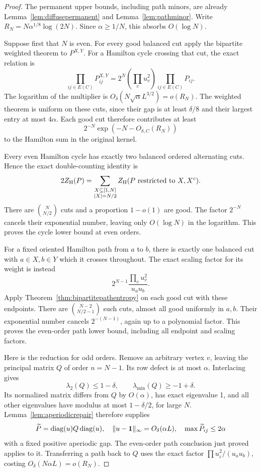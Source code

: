 \begin{proof}
The permanent upper bounds, including path minors, are already
Lemma~\ref{lem:diffusepermanent} and Lemma~\ref{lem:pathminor}.
Write \(R_N=N\alpha^{1/8}\log(2N)\).
Since \(\alpha\geq1/N\), this absorbs \(O(\log N)\).

Suppose first that \(N\) is even.
For every good balanced cut apply the bipartite weighted
theorem to \(P^{X,Y}\).
For a Hamilton cycle crossing that cut, the exact relation is
\[
 \prod_{ij\in E(C)}P^{X,Y}_{ij}
       =2^N\left(\prod_vu_v^2\right)
                         \prod_{ij\in E(C)}P_{ij}.
\]
The logarithm of the multiplier is
\(O_\delta(N\sqrt\alpha L^{3/2})=o(R_N)\).
The weighted theorem is uniform on these cuts, since their
gap is at least \(\delta/8\) and their largest entry at most
\(4\alpha\). Each good cut therefore contributes at least
\[
 2^{-N}\exp(-N-O_{\delta,C}(R_N))
\]
to the Hamilton sum in the original kernel.

Every even Hamilton cycle has exactly two balanced ordered
alternating cuts. Hence the exact double-counting identity is
\[
 2Z_{\rm H}(P)
       =\sum_{\substack{X\subseteq[1,N]\\|X|=N/2}}
                        Z_{\rm H}(P\hbox{ restricted to }X,X^c).
\]
There are \(\binom N{N/2}\) cuts and a proportion \(1-o(1)\)
are good. The factor \(2^{-N}\) cancels their exponential
number, leaving only \(O(\log N)\) in the logarithm.
This proves the cycle lower bound at even orders.

For a fixed oriented Hamilton path from \(a\) to \(b\),
there is exactly one balanced cut with \(a\in X,b\in Y\)
which it crosses throughout.
The exact scaling factor for its weight is instead
\[
 2^{N-1}\frac{\prod_vu_v^2}{u_a u_b}.
\]
Apply Theorem~\ref{thm:bipartitepathentropy} on each good cut
with these endpoints.
There are \(\binom{N-2}{N/2-1}\) such cuts, almost all good
uniformly in \(a,b\). Their exponential number cancels
\(2^{-(N-1)}\), again up to a polynomial factor.
This proves the even-order path lower bound, including all
endpoint and scaling factors.

Here is the reduction for odd orders.
Remove an arbitrary vertex \(v\), leaving the principal
matrix \(Q\) of order \(n=N-1\).
Its row defect is at most \(\alpha\).
Interlacing gives
\[
 \lambda_2(Q)\leq1-\delta,\qquad
 \lambda_{\min}(Q)\geq-1+\delta .
\]
Its normalized matrix differs from \(Q\) by \(O(\alpha)\),
has exact eigenvalue 1, and all other eigenvalues have modulus
at most \(1-\delta/2\), for large \(N\).
Lemma~\ref{lem:aperiodicrepair} therefore supplies
\[
 \widetilde P=\operatorname{diag}(u)Q\operatorname{diag}(u),\quad
 \|u-\mathbf1\|_\infty=O_\delta(\alpha L),\quad
 \max\widetilde P_{ij}\leq2\alpha
\]
with a fixed positive aperiodic gap.
The even-order path conclusion just proved applies to it.
Transferring a path back to \(Q\) uses the exact factor
\(\prod u_i^2/(u_a u_b)\), costing \(O_\delta(N\alpha L)=o(R_N)\).


\end{proof}
